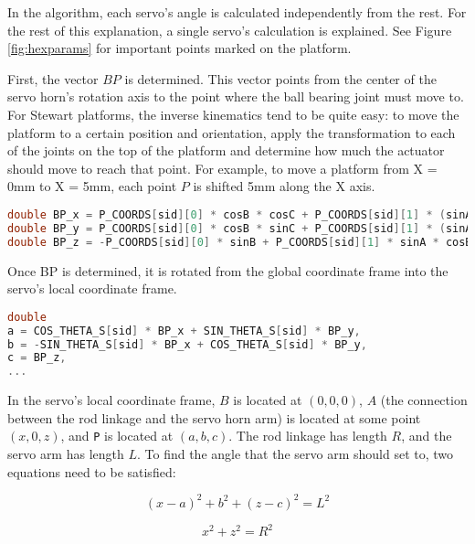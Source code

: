 \documentclass[12pt,a4paper]{report}
\begin{document}
In the algorithm, each servo’s angle is calculated independently from the rest. For the rest of this explanation, a single servo’s calculation is explained. See Figure \ref{fig:hexparams} for important points marked on the platform.

First, the vector \(BP\) is determined. This vector points from the center of the servo horn’s rotation axis to the point where the ball bearing joint must move to. For Stewart platforms, the inverse kinematics tend to be quite easy: to move the platform to a certain position and orientation, apply the transformation to each of the joints on the top of the platform and determine how much the actuator should move to reach that point. For example, to move a platform from X = 0mm to X = 5mm, each point \(P\) is shifted 5mm along the X axis. 

\begin{lstlisting}[language=C++]
double BP_x = P_COORDS[sid][0] * cosB * cosC + P_COORDS[sid][1] * (sinA * sinB * cosC - cosA * sinC) + coord.hx_x - B_COORDS[sid][0];
double BP_y = P_COORDS[sid][0] * cosB * sinC + P_COORDS[sid][1] * (sinA * sinB * sinC + cosA * cosC) + coord.hx_y - B_COORDS[sid][1];
double BP_z = -P_COORDS[sid][0] * sinB + P_COORDS[sid][1] * sinA * cosB + coord.hx_z - Z_HOME;
\end{lstlisting}

Once BP is determined, it is rotated from the global coordinate frame into the servo’s local coordinate frame.

\begin{lstlisting}[language=C++]
double
a = COS_THETA_S[sid] * BP_x + SIN_THETA_S[sid] * BP_y,
b = -SIN_THETA_S[sid] * BP_x + COS_THETA_S[sid] * BP_y,
c = BP_z,
...
\end{lstlisting}

In the servo’s local coordinate frame, \(B\) is located at \((0, 0, 0)\), \(A\) (the connection between the rod linkage and the servo horn arm) is located at some point \((x, 0, z)\), and \verb|P| is located at \((a, b, c)\). The rod linkage has length \(R\), and the servo arm has length \(L\). To find the angle that the servo arm should set to, two equations need to be satisfied:

\begin{equation}\label{eq:2eq1}
	(x-a)^2 + b^2 + (z-c)^2 = L^2
\end{equation}

\begin{equation}\label{2eq2}
	x^2 + z^2 = R^2
\end{equation}
\end{document}
